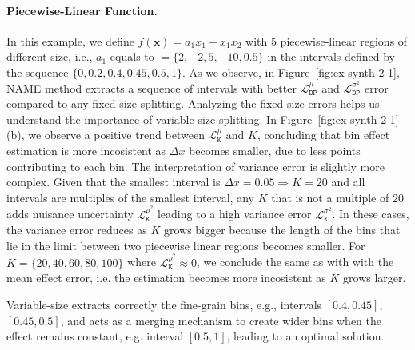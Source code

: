 \documentclass[twoside]{article}
\begin{document}
\paragraph{Piecewise-Linear Function.}

In this example, we define \(f(\mathbf{x}) = a_1x_1 + x_1x_2\) with
\(5\) piecewise-linear regions of different-size, i.e., \(a_1\) equals
to \(=\{2, -2, 5, -10, 0.5\}\) in the intervals defined by the
sequence \(\{0, 0.2, 0.4, 0.45, 0.5, 1\}\). As we observe, in
Figure~\ref{fig:ex-synth-2-1}, NAME method extracts a sequence of
intervals with better \(\mathcal{L}_{\mathtt{DP}}^{\mu}\) and
\(\mathcal{L}_{\mathtt{DP}}^{\sigma^2}\) error compared to any
fixed-size splitting. Analyzing the fixed-size errors helps us
understand the importance of variable-size splitting. In
Figure~\ref{fig:ex-synth-2-1}(b), we observe a positive trend between
\(\mathcal{L}^{\mu}_{\mathtt{K}}\) and \(K\), concluding that bin
effect estimation is more incosistent as \(\Delta x\) becomes smaller,
due to less points contributing to each bin. The interpretation of
variance error is slightly more complex. Given that the smallest
interval is \(\Delta x = 0.05 \Rightarrow K = 20\) and all intervals
are multiples of the smallest interval, any \(K\) that is not a
multiple of \(20\) adds nuisance uncertainty
\(\mathcal{L}^{\rho^2}_{\mathtt{K}}\) leading to a high variance error
\(\mathcal{L}^{\sigma^2}_{\mathtt{K}}\). In these cases, the variance
error reduces as \(K\) grows bigger because the length of the bins
that lie in the limit between two piecewise linear regions becomes
smaller. For \(K=\{20, 40, 60, 80, 100\}\) where
\(\mathcal{L}^{\rho^2}_{\mathtt{K}} \approx 0\), we conclude the same
as with with the mean effect error, i.e. the estimation becomes more
incosistent as \(K\) grows larger.

Variable-size extracts correctly the fine-grain bins, e.g., intervals
\([0.4, 0.45]\), \([0.45, 0.5]\), and acts as a merging mechanism to
create wider bins when the effect remains constant, e.g. interval
\([0.5, 1]\), leading to an optimal solution.
\end{document}
